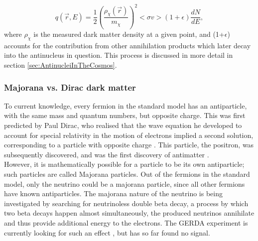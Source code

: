 \begin{equation}\label{eq:IntroDM_source_term}
    q(\vec{r}, E) = \frac{1}{2} \left( \frac{\rho_{\chi}(\vec{r})}{m_\chi}\right)^2 <\sigma v > (1+\epsilon) \frac{dN}{dE},
\end{equation}
where $\rho_\chi$ is the measured dark matter density at a given point, and (1+$\epsilon$) accounts for the contribution from other annihilation products which later decay into the antinucleus in question. This process is discussed in more detail in section \ref{sec:AntinucleiInTheCosmos}.


\subsubsection{Majorana vs. Dirac dark matter}\label{sec:IntroMajoranaDiracDM}
To current knowledge, every fermion in the standard model has an antiparticle, with the same mass and quantum numbers, but opposite charge. This was first predicted by Paul Dirac, who realised that the wave equation he developed to account for special relativity in the motion of electrons implied a second solution, corresponding to a particle with opposite charge \cite{Dirac}. This particle, the positron, was subsequently discovered, and was the first discovery of antimatter \cite{positron_discovery}. \\

However, it is mathematically possible for a particle to be its own antiparticle; such particles are called Majorana particles. Out of the fermions in the standard model, only the neutrino could be a majorana particle, since all other fermions have known antiparticles. The majorana nature of the neutrino is being investigated by searching for neutrinoless double beta decay, a process by which two beta decays happen almost simultaneously, the produced neutrinos annihilate and thus provide additional energy to the electrons. The GERDA experiment is currently looking for such an effect \cite{GERDA}, but has so far found no signal. \\

